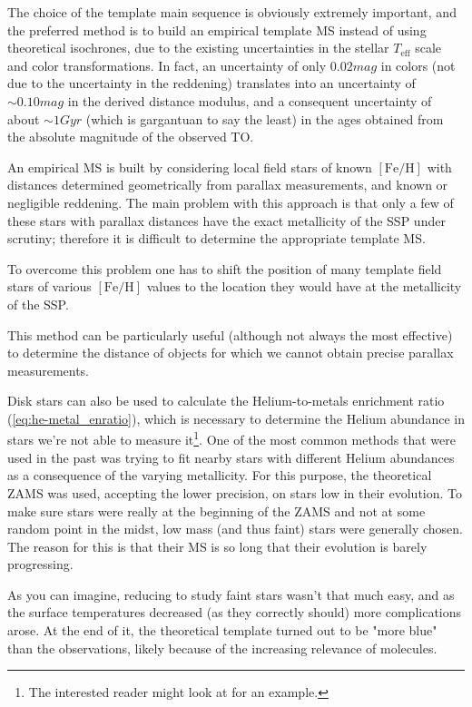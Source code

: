 \par The choice of the template main sequence is obviously extremely important, and the preferred method is to build an empirical template MS instead of using theoretical isochrones, due to the existing uncertainties in the stellar $T_{\text{eff}}$ scale and color transformations. In fact, an uncertainty of only $0.02\unit{mag}$ in colors (not due to the uncertainty in the reddening) translates into an uncertainty of $\sim0.10\unit{mag}$ in the derived distance modulus, and a consequent uncertainty of about $\sim 1\unit{Gyr}$ (which is gargantuan to say the least) in the ages obtained from the absolute magnitude of the observed TO.
\par An empirical MS is built by considering local field stars of known $[\text{Fe}/\text{H}]$ with distances determined geometrically from parallax measurements, and known or negligible reddening. The main problem with this approach is that only a few of these stars with parallax distances have the exact metallicity of the SSP under scrutiny; therefore it is difficult to determine the appropriate template MS.
\par To overcome this problem one has to shift the position of many template field stars of various $[\text{Fe}/\text{H}]$ values to the location they would have at the metallicity of the SSP.
\par This method can be particularly useful (although not always the most effective) to determine the distance of objects for which we cannot obtain precise parallax measurements.
\par Disk stars can also be used to calculate the Helium-to-metals enrichment ratio (\ref{eq:he-metal_enratio}), which is necessary to determine the Helium abundance in stars we're not able to measure it\footnote{The interested reader might look at \cite{1999A&A...349..834C} for an example.}. One of the most common methods that were used in the past was trying to fit nearby stars with different Helium abundances as a consequence of the varying metallicity. For this purpose, the theoretical ZAMS was used, accepting the lower precision, on stars low in their evolution. To make sure stars were really at the beginning of the ZAMS and not at some random point in the midst, low mass (and thus faint) stars were generally chosen. The reason for this is that their MS is so long that their evolution is barely progressing.
\par As you can imagine, reducing to study faint stars wasn't that much easy, and as the surface temperatures decreased (as they correctly should) more complications arose. At the end of it, the theoretical template turned out to be "more blue" than the observations, likely because of the increasing relevance of molecules.

